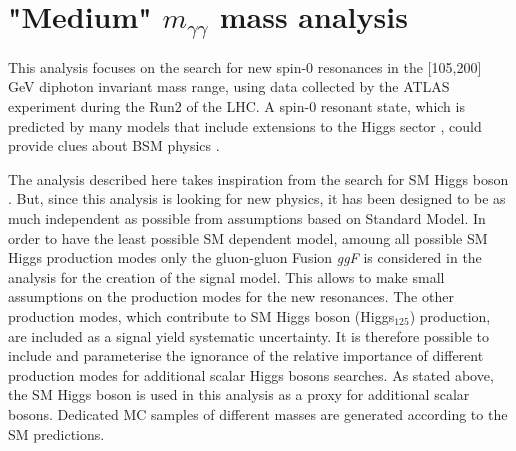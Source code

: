 \documentclass[a4paper, oneside, 11pt, openright]{book}
\begin{document}
 	\chapter{"Medium" $m_{\gamma\gamma}$ mass analysis}\label{chapter:4}
 		This analysis focuses on the search for new spin-0 resonances in the [105,200] GeV diphoton invariant mass range, using data collected by the ATLAS experiment during the Run2 of the LHC. A spin-0 resonant state, which is predicted by many models that include extensions to the Higgs sector \cite{BSM}, could provide clues about BSM physics \cite{Branco_2012,dine_2016}. 	
 		
 		The analysis described here takes inspiration from the search for SM Higgs boson \cite{higgs_atlas}. But, since this analysis is looking for new physics, it has been designed to be as much independent as possible from assumptions based on Standard Model. In order to have the least possible SM dependent model, amoung all possible SM Higgs production modes only the gluon-gluon Fusion \textit{ggF} is considered in the analysis for the creation of the signal model. This allows to make small assumptions on the production modes for the new resonances. The other production modes, which contribute to SM Higgs boson (Higgs$_{125}$) production, are included as a signal yield systematic uncertainty. It is therefore possible to include and parameterise the ignorance of the relative importance of different production modes for additional scalar Higgs bosons searches. As stated above, the SM Higgs boson is used in this analysis as a proxy for additional scalar bosons. Dedicated MC samples of different masses are generated according to the SM predictions.
 		
\end{document}
